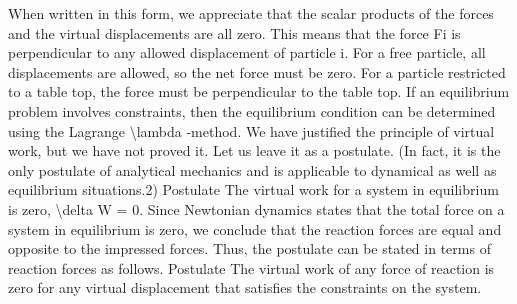 When written in this form, we appreciate that the scalar products of the forces
and the virtual displacements are all zero. This means that the force Fi is
perpendicular to any allowed displacement of particle i. For a free particle,
all displacements are allowed, so the net force must be zero. For a particle
restricted to a table top, the force must be perpendicular to the table top.
If an equilibrium problem involves constraints, then the equilibrium condition can be determined using the Lagrange \textbackslash{}lambda -method.
We have justified the principle of virtual work, but we have not proved it.
Let us leave it as a postulate. (In fact, it is the only postulate of analytical
mechanics and is applicable to dynamical as well as equilibrium situations.2)
Postulate
The virtual work for a system in equilibrium is zero,
\textbackslash{}delta W = 0.
Since Newtonian dynamics states that the total force on a system in equilibrium is zero, we conclude that the reaction forces are equal and opposite to the
impressed forces. Thus, the postulate can be stated in terms of reaction forces
as follows.
Postulate
The virtual work of any force of reaction is zero for any virtual
displacement that satisfies the constraints on the system.

